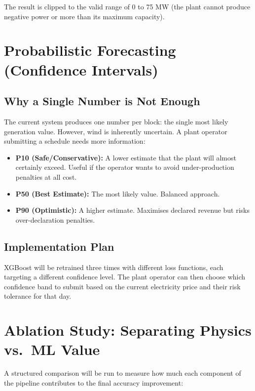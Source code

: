 \documentclass[12pt,a4paper]{report}
\begin{document}
The result is clipped to the valid range of 0 to 75 MW (the plant cannot produce negative power or more than its maximum capacity).

\section{Probabilistic Forecasting (Confidence Intervals)}

\subsection{Why a Single Number is Not Enough}

The current system produces one number per block: the single most likely generation value. However, wind is inherently uncertain. A plant operator submitting a schedule needs more information:

\begin{itemize}
    \item \textbf{P10 (Safe/Conservative):} A lower estimate that the plant will almost certainly exceed. Useful if the operator wants to avoid under-production penalties at all cost.
    \item \textbf{P50 (Best Estimate):} The most likely value. Balanced approach.
    \item \textbf{P90 (Optimistic):} A higher estimate. Maximises declared revenue but risks over-declaration penalties.
\end{itemize}

\subsection{Implementation Plan}

XGBoost will be retrained three times with different loss functions, each targeting a different confidence level. The plant operator can then choose which confidence band to submit based on the current electricity price and their risk tolerance for that day.

\section{Ablation Study: Separating Physics vs.\ ML Value}

A structured comparison will be run to measure how much each component of the pipeline contributes to the final accuracy improvement:
\end{document}
